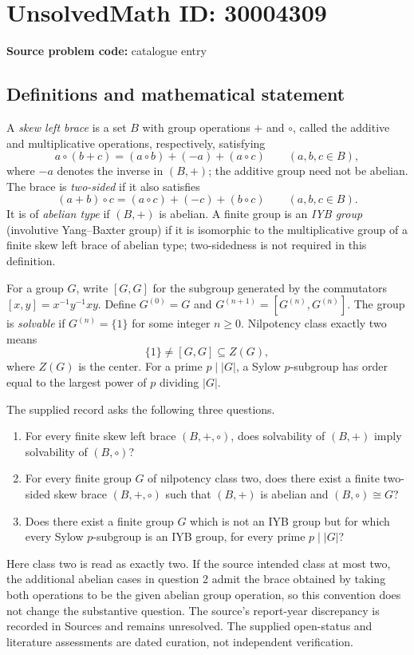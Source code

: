 \documentclass[11pt]{article}
\begin{document}
\section*{UnsolvedMath ID: 30004309}
\textbf{Source problem code:} catalogue entry
\subsection{Definitions and mathematical statement}
A \emph{skew left brace} is a set \(B\) with group operations \(+\) and \(\circ\), called the additive and multiplicative operations, respectively, satisfying
\[
 a\circ(b+c)=(a\circ b)+(-a)+(a\circ c)
 \qquad(a,b,c\in B),
\]
where \(-a\) denotes the inverse in \((B,+)\); the additive group need not be abelian. The brace is \emph{two-sided} if it also satisfies
\[
 (a+b)\circ c=(a\circ c)+(-c)+(b\circ c)
 \qquad(a,b,c\in B).
\]
It is of \emph{abelian type} if \((B,+)\) is abelian. A finite group is an \emph{IYB group} (involutive Yang--Baxter group) if it is isomorphic to the multiplicative group of a finite skew left brace of abelian type; two-sidedness is not required in this definition.

For a group \(G\), write \([G,G]\) for the subgroup generated by the commutators \([x,y]=x^{-1}y^{-1}xy\). Define \(G^{(0)}=G\) and \(G^{(n+1)}=[G^{(n)},G^{(n)}]\). The group is \emph{solvable} if \(G^{(n)}=\{1\}\) for some integer \(n\geq0\). Nilpotency class exactly two means
\[
 \{1\}\neq [G,G]\subseteq Z(G),
\]
where \(Z(G)\) is the center. For a prime \(p\mid |G|\), a Sylow \(p\)-subgroup has order equal to the largest power of \(p\) dividing \(|G|\).

The supplied record asks the following three questions.
\begin{enumerate}
\item For every finite skew left brace \((B,+,\circ)\), does solvability of \((B,+)\) imply solvability of \((B,\circ)\)?
\item For every finite group \(G\) of nilpotency class two, does there exist a finite two-sided skew brace \((B,+,\circ)\) such that \((B,+)\) is abelian and \((B,\circ)\cong G\)?
\item Does there exist a finite group \(G\) which is not an IYB group but for which every Sylow \(p\)-subgroup is an IYB group, for every prime \(p\mid |G|\)?
\end{enumerate}
Here class two is read as exactly two. If the source intended class at most two, the additional abelian cases in question 2 admit the brace obtained by taking both operations to be the given abelian group operation, so this convention does not change the substantive question. The source's report-year discrepancy is recorded in Sources and remains unresolved. The supplied open-status and literature assessments are dated curation, not independent verification.
\end{document}
